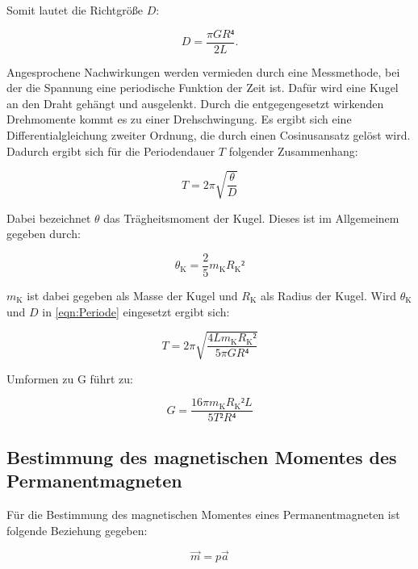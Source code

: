 Somit lautet die Richtgröße $D$:

\begin{equation*}
D = \frac{\pi G R⁴}{2 L}.
\end{equation*}

Angesprochene Nachwirkungen werden vermieden durch eine Messmethode, 
bei der die Spannung eine periodische Funktion der Zeit ist. Dafür 
wird eine Kugel an den Draht gehängt und ausgelenkt. Durch die entgegengesetzt
wirkenden Drehmomente kommt es zu einer Drehschwingung. 
Es ergibt sich eine Differentialgleichung zweiter Ordnung, die durch einen 
Cosinusansatz gelöst wird. Dadurch ergibt sich für die Periodendauer $T$
folgender Zusammenhang: 

\begin{equation}
T = 2\pi \sqrt{\frac{\theta}{D}}
\label{eqn:Periode}
\end{equation}

Dabei bezeichnet $\theta$ das Trägheitsmoment der Kugel. Dieses ist im 
Allgemeinem gegeben durch: 

\begin{equation}
\theta_\text{K} = \frac{2}{5} m_\text{K}R_\text{K}²
\label{eqn:Kugel}
\end{equation}

$m_\text{K}$ ist dabei gegeben als Masse der Kugel und $R_\text{K}$ als Radius
der Kugel. Wird $\theta_\text{K}$ und $D$ in \eqref{eqn:Periode} eingesetzt ergibt sich: 

\begin{equation*}
T = 2\pi \sqrt{\frac{4Lm_\text{K}R_\text{K}²}{5\pi GR⁴}}
\end{equation*}

Umformen zu G führt zu: 

\begin{equation}
G = \frac{16\pi m_\text{K} R_\text{K}² L}{5T²R⁴}
\label{eqn:Schubmodul}
\end{equation}

\subsection{Bestimmung des magnetischen Momentes des Permanentmagneten}

Für die Bestimmung des magnetischen Momentes eines Permanentmagneten ist 
folgende Beziehung gegeben: 

\begin{equation*}
\vec{m} = p \vec{a}
\end{equation*}

